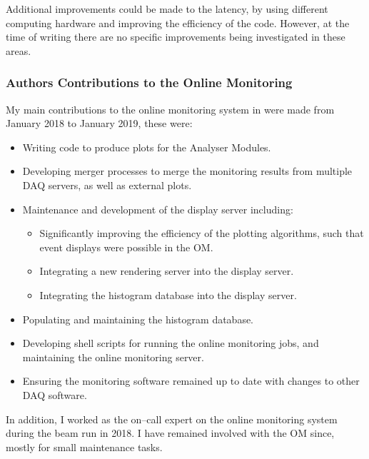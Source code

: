 Additional improvements could be made to the latency, by using different 
computing hardware and improving the efficiency of the code. However, at the 
time of writing there are no specific improvements being investigated in these 
areas.

\newpage
\subsubsection*{Authors Contributions to the \protodune{} Online Monitoring}
My main contributions to the online monitoring system in \protodune{} were made
from January 2018 to January 2019, these were: 
\begin{itemize}
	\item Writing code to produce plots for the Analyser Modules.
	\item Developing merger processes to merge the monitoring results from
		multiple DAQ servers, as well as external plots.
	\item Maintenance and development of the display server including:
	\begin{itemize}
		\item Significantly improving the efficiency of the plotting algorithms,
			such that event displays were possible in the OM.
		\item Integrating a new rendering server into the display server.
		\item Integrating the histogram database into the display server.
	\end{itemize}
	\item Populating and maintaining the histogram database.
	\item Developing shell scripts for running the online monitoring jobs, and
		maintaining the online monitoring server.
	\item Ensuring the monitoring software remained up to date with changes to
		other DAQ software.
\end{itemize}
In addition, I worked as the on--call expert on the online monitoring system
during the \protodune{} beam run in 2018. I have remained involved with the OM 
since, mostly for small maintenance tasks. 
